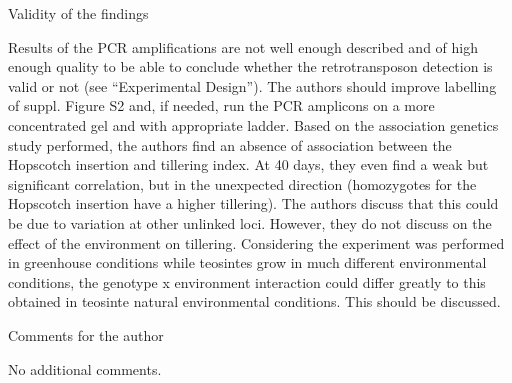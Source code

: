 \documentclass[]{article}
\begin{document}
Validity of the findings

Results of the PCR amplifications are not well enough described and of high enough quality to be able to conclude whether the retrotransposon detection is valid or not (see “Experimental Design”). The authors should improve labelling of suppl. Figure S2 and, if needed, run the PCR amplicons on a more concentrated gel and with appropriate ladder.
Based on the association genetics study performed, the authors find an absence of association between the Hopscotch insertion and tillering index. At 40 days, they even find a weak but significant correlation, but in the unexpected direction (homozygotes for the Hopscotch insertion have a higher tillering). The authors discuss that this could be due to variation at other unlinked loci. However, they do not discuss on the effect of the environment on tillering. Considering the experiment was performed in greenhouse conditions while teosintes grow in much different environmental conditions, the genotype x environment interaction could differ greatly to this obtained in teosinte natural environmental conditions. This should be discussed.

Comments for the author

No additional comments.
\end{document}
